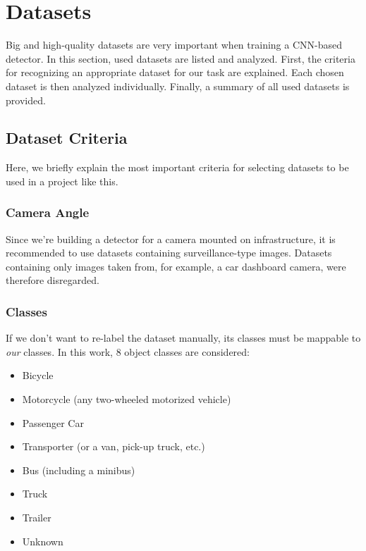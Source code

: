 







\chapter{Datasets}

Big and high-quality datasets are very important when training a CNN-based
detector. In this section, used datasets are listed and analyzed. First, the
criteria for recognizing an appropriate dataset for our task are explained. Each
chosen dataset is then analyzed individually. Finally, a summary of all used
datasets is provided.

\section{Dataset Criteria}

Here, we briefly explain the most important criteria for selecting datasets to
be used in a project like this.

\subsection*{Camera Angle}

Since we're building a detector for a camera mounted on infrastructure, it is
recommended to use datasets containing surveillance-type images. Datasets
containing only images taken from, for example, a car dashboard camera, were
therefore disregarded.

\subsection*{Classes}

If we don't want to re-label the dataset manually, its classes must be mappable
to \textit{our} classes. In this work, 8 object classes are considered:
\begin{itemize}
    \item Bicycle
    \item Motorcycle (any two-wheeled motorized vehicle)
    \item Passenger Car
    \item Transporter (or a van, pick-up truck, etc.)
    \item Bus (including a minibus)
    \item Truck
    \item Trailer
    \item Unknown
\end{itemize}

